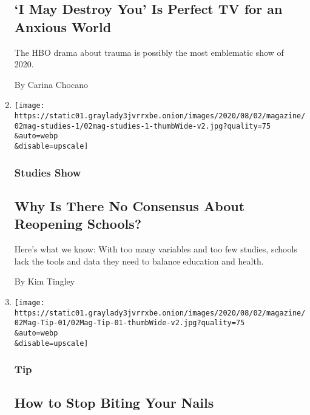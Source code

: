 \begin{enumerate}
  \hypertarget{i-may-destroy-you-is-perfect-tv-for-an-anxious-world}{%
  \subsection{`I May Destroy You' Is Perfect TV for an Anxious
  World}\label{i-may-destroy-you-is-perfect-tv-for-an-anxious-world}}

  The HBO drama about trauma is possibly the most emblematic show of
  2020.

  By Carina Chocano
\item
  \href{/2020/07/29/magazine/schools-reopening-covid.html}{}

  \texttt{[image: https://static01.graylady3jvrrxbe.onion/images/2020/08/02/magazine/02mag-studies-1/02mag-studies-1-thumbWide-v2.jpg?quality=75\\\&auto=webp\\\&disable=upscale]}

  \hypertarget{studies-show}{%
  \subsubsection{Studies Show}\label{studies-show}}

  \hypertarget{why-is-there-no-consensus-about-reopening-schools}{%
  \subsection{Why Is There No Consensus About Reopening
  Schools?}\label{why-is-there-no-consensus-about-reopening-schools}}

  Here's what we know: With too many variables and too few studies,
  schools lack the tools and data they need to balance education and
  health.

  By Kim Tingley
\item
  \href{/2020/07/28/magazine/how-to-stop-biting-your-nails.html}{}

  \texttt{[image: https://static01.graylady3jvrrxbe.onion/images/2020/08/02/magazine/02Mag-Tip-01/02Mag-Tip-01-thumbWide-v2.jpg?quality=75\\\&auto=webp\\\&disable=upscale]}

  \hypertarget{tip-}{%
  \subsubsection{Tip }\label{tip-}}

  \hypertarget{how-to-stop-biting-your-nails}{%
  \subsection{How to Stop Biting Your
  Nails}\label{how-to-stop-biting-your-nails}}


\end{enumerate}

